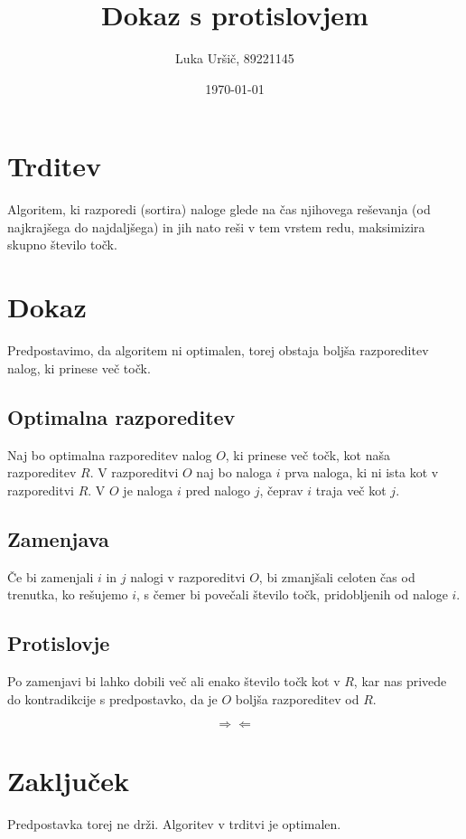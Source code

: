 \documentclass{article}
\begin{document}
\title{Dokaz s protislovjem}
\author{Luka Uršič, 89221145}
\date{\today}

\maketitle

\section{Trditev}

Algoritem, ki razporedi (sortira) naloge glede na čas njihovega reševanja (od najkrajšega do najdaljšega) in jih nato reši v tem vrstem redu, maksimizira skupno število točk.

\section{Dokaz}

Predpostavimo, da algoritem ni optimalen, torej obstaja boljša razporeditev nalog, ki prinese več točk.

\subsection{Optimalna razporeditev}

Naj bo optimalna razporeditev nalog $O$, ki prinese več točk, kot naša razporeditev $R$. V razporeditvi $O$ naj bo naloga $i$ prva naloga, ki ni ista kot v razporeditvi $R$. V $O$ je naloga $i$ pred nalogo $j$, čeprav $i$ traja več kot $j$.

\subsection{Zamenjava}

Če bi zamenjali $i$ in $j$ nalogi v razporeditvi $O$, bi zmanjšali celoten čas od trenutka, ko rešujemo $i$, s čemer bi povečali število točk, pridobljenih od naloge $i$.

\subsection{Protislovje}

Po zamenjavi bi lahko dobili več ali enako število točk kot v $R$, kar nas privede do kontradikcije s predpostavko, da je $O$ boljša razporeditev od $R$.

\[
    \Rightarrow\!\Leftarrow
\]

\section{Zaključek}

Predpostavka torej ne drži. Algoritev v trditvi je optimalen.
\end{document}
